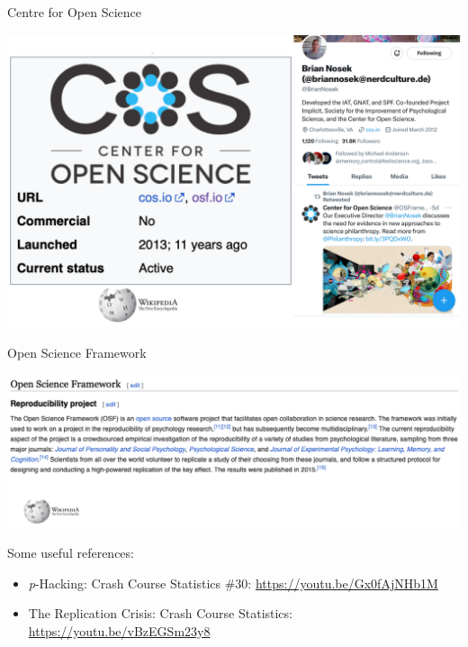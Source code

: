 \documentclass[
  ignorenonframetext,
  aspectratio=169,
]{beamer}
\providecommand{\tightlist}{%
  \setlength{\itemsep}{0pt}\setlength{\parskip}{0pt}}\usepackage{longtable,booktabs,array}
\begin{document}
\begin{frame}{Centre for Open Science}
\label{centre-for-open-science}
\begin{center}
\includegraphics{figs/cos.png}
\end{center}
\end{frame}

\begin{frame}{Open Science Framework}
\label{open-science-framework}
\begin{center}
\includegraphics{figs/osf.png}
\end{center}
\end{frame}

\begin{frame}{Some useful references:}
\label{some-useful-references}
\begin{itemize}
\tightlist
\item
  \emph{p}-Hacking: Crash Course Statistics \#30:
  \url{https://youtu.be/Gx0fAjNHb1M}
\item
  The Replication Crisis: Crash Course Statistics:
  \url{https://youtu.be/vBzEGSm23y8}
\end{itemize}
\end{frame}
\end{document}
